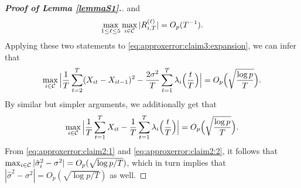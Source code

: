 \documentclass[a4paper,12pt]{article}
\numberwithin{equation}{section}
\begin{document}
\begin{proof}[\textnormal{\textbf{Proof of Lemma \ref{lemmaS1}.}}]
and 
\[ \max_{1 \le \ell \le 5} \max_{i \in \mathcal{C}} |R_{i,T}^{(\ell)}| = O_p(T^{-1}). \]
Applying these two statements to \eqref{eq:approxerror:claim3:expansion}, we can infer that
\begin{equation}\label{eq:approxerror:claim2:1}
\max_{i \in \mathcal{C}} \Big| \frac{1}{T} \sum\limits_{t=2}^T (X_{it} - X_{it-1})^2 - \frac{2\sigma^2}{T} \sum\limits_{t=1}^T \lambda_i\Big(\frac{t}{T}\Big) \Big| = O_p\Big( \sqrt{\frac{\log p}{T}} \Big). 
\end{equation}
By similar but simpler arguments, we additionally get that 
\begin{equation}\label{eq:approxerror:claim2:2}
\max_{i \in \mathcal{C}} \Big| \frac{1}{T} \sum\limits_{t=1}^T X_{it} - \frac{1}{T} \sum\limits_{t=1}^T \lambda_i\Big(\frac{t}{T}\Big) \Big| = O_p\Big( \sqrt{\frac{\log p}{T}} \Big). 
\end{equation}
From \eqref{eq:approxerror:claim2:1} and \eqref{eq:approxerror:claim2:2}, it follows that $\max_{i \in \mathcal{C}} |\hat{\sigma}_i^2 - \sigma^2| = O_p(\sqrt{\log p / T})$, which in turn implies that $|\hat{\sigma}^2 - \sigma^2| = O_p(\sqrt{\log p / T})$ as well. 
\end{proof} 
\end{document}
